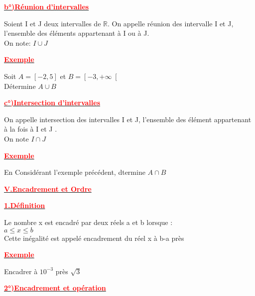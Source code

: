 \documentclass[12pt]{article}
\begin{document}
\begin{center}
\underline{\textbf{\textcolor{red}{b°)Réunion d'intervalles}}}\\
\end{center}
Soient I et J deux intervalles de $\mathbb{R}$. On appelle réunion des intervalle I et J, l'ensemble des éléments appartenant à I ou à J.\\
On note: $I \cup J$ 
\begin{center}
\underline{\textbf{\textcolor{red}{Exemple}}}\\
\end{center} 
Soit $A=\left[ -2,5\right] $ et $B=\left[ -3, +\infty\right[ $\\
Détermine $A \cup B$ 
\begin{center}
\underline{\textbf{\textcolor{red}{c°)Intersection d'intervalles}}}\\
\end{center}
On appelle intersection des intervalles I et J, l'ensemble des élément appartenant à la fois à I et J .\\
On note $I \cap J$
\begin{center}
\underline{\textbf{\textcolor{red}{Exemple}}}\\
\end{center} 
En Considérant l'exemple précédent, dtermine $A \cap B$
\begin{center}
\underline{\textbf{\textcolor{red}{V.Encadrement et Ordre}}}\\
\end{center}

\begin{center}
\underline{\textbf{\textcolor{red}{1.Définition}}}\\
\end{center}
Le nombre x est encadré par deux réels a et b lorsque :\\
$a\leqslant x \leqslant b$ \\
Cette inégalité est appelé encadrement du réel x à b-a près

\begin{center}
\underline{\textbf{\textcolor{red}{Exemple}}}\\
\end{center}
Encadrer à $10^{-3}$ près $\sqrt{3}$\\

\begin{center}
\underline{\textbf{\textcolor{red}{2°)Encadrement et opération}}}
\end{center}
\end{document}
